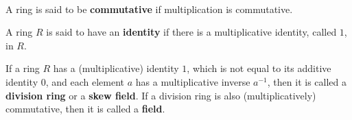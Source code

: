 \documentclass{article}
\begin{document}
\begin{definition}
\


A ring is said to be \textbf{commutative} if multiplication is commutative.

A ring $R$ is said to have an \textbf{identity} if there is a multiplicative identity, called $1$, in $R$.
\end{definition}

\begin{definition}
If a ring $R$ has a (multiplicative) identity $1$, which is not equal to its additive identity $0$, and each element $a$ has a multiplicative inverse $a ^{-1}$, then it is called a \textbf{division ring} or a \textbf{skew field}. If a division ring is also (multiplicatively) commutative, then it is called a \textbf{field}. 
\end{definition}
\end{document}

